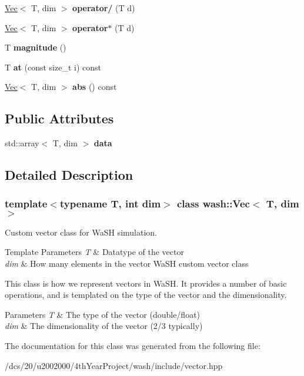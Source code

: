 \begin{DoxyCompactItemize}
\mbox{\hyperlink{classwash_1_1Vec}{Vec}}$<$ T, dim $>$ {\bfseries operator/} (T d)
\item 
\mbox{\label{classwash_1_1Vec_a6fc9e30b352c72c7307bd28ee6c0aa72}} 
\mbox{\hyperlink{classwash_1_1Vec}{Vec}}$<$ T, dim $>$ {\bfseries operator$\ast$} (T d)
\item 
\mbox{\label{classwash_1_1Vec_a41de499daf12160b2cf515ce0c9da70f}} 
T {\bfseries magnitude} ()
\item 
\mbox{\label{classwash_1_1Vec_a1be26013b6d4f898b8504fc258043400}} 
T {\bfseries at} (const size\+\_\+t i) const
\item 
\mbox{\label{classwash_1_1Vec_aae15a1a2cea7e883e53c2e7f6164710a}} 
\mbox{\hyperlink{classwash_1_1Vec}{Vec}}$<$ T, dim $>$ {\bfseries abs} () const
\end{DoxyCompactItemize}
\subsection*{Public Attributes}
\begin{DoxyCompactItemize}
\item 
\mbox{\label{classwash_1_1Vec_a1f8030900a506e51197d5af4ec4d1143}} 
std\+::array$<$ T, dim $>$ {\bfseries data}
\end{DoxyCompactItemize}


\subsection{Detailed Description}
\subsubsection*{template$<$typename T, int dim$>$\newline
class wash\+::\+Vec$<$ T, dim $>$}

Custom vector class for Wa\+SH simulation. 


\begin{DoxyTemplParams}{Template Parameters}
{\em T} & Datatype of the vector \\
\hline
{\em dim} & How many elements in the vector Wa\+SH custom vector class\\
\hline
\end{DoxyTemplParams}
This class is how we represent vectors in Wa\+SH. It provides a number of basic operations, and is templated on the type of the vector and the dimensionality. 
\begin{DoxyParams}{Parameters}
{\em T} & The type of the vector (double/float) \\
\hline
{\em dim} & The dimensionality of the vector (2/3 typically) \\
\hline
\end{DoxyParams}


The documentation for this class was generated from the following file\+:\begin{DoxyCompactItemize}
\item 
/dcs/20/u2002000/4th\+Year\+Project/wash/include/vector.\+hpp\end{DoxyCompactItemize}

